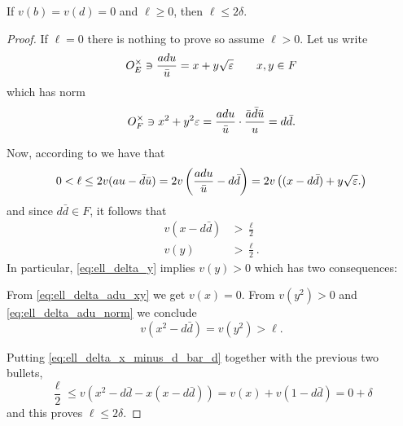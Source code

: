 \begin{lemma}
  [$\ell \le 2 \delta$]
  If $v(b) = v(d) = 0$ and $\ell \ge 0$, then $\ell \le 2 \delta$.
  \label{lem:ell_le_2_delta}
\end{lemma}
\begin{proof}
  If $\ell = 0$ there is nothing to prove so assume $\ell > 0$.
  Let us write
  \begin{equation}
    O_E^\times \ni \frac{a d u}{\bar u} = x + y \sqrt{\varepsilon} \qquad x,y \in F
    \label{eq:ell_delta_adu_xy}
  \end{equation}
  which has norm
  \begin{equation}
    O_F^\times \ni x^2+y^2\varepsilon
    = \frac{a d u}{\bar u} \cdot \frac{\bar a \bar d \bar u}{u} = d \bar d.
    \label{eq:ell_delta_adu_norm}
  \end{equation}

  Now, according to  we have that
  \[ 0 < \ell \le 2v(au - \bar d \bar u)
    = 2v\left( \frac{a d u}{\bar u} - d \bar d \right)
    = 2v\left(  (x - d \bar d) + y \sqrt{\varepsilon}. \right) \]
  and since $d \bar d \in F$, it follows that
  \begin{align}
    v\left( x - d \bar d \right) &> \frac{\ell}{2} \label{eq:ell_delta_x_minus_d_bar_d} \\
    v(y) &> \frac{\ell}{2}. \label{eq:ell_delta_y}
  \end{align}
  In particular, \eqref{eq:ell_delta_y} implies $v(y) > 0$ which has two consequences:
  \begin{itemize}
    \ii From \eqref{eq:ell_delta_adu_xy} we get $v(x) = 0$.
    \ii From $v(y^2) > 0$ and \eqref{eq:ell_delta_adu_norm}
    we conclude \[ v(x^2 - d \bar d) = v(y^2) > \ell. \]
  \end{itemize}
  Putting \eqref{eq:ell_delta_x_minus_d_bar_d} together with the previous two bullets,
  \[ \frac{\ell}{2} \le v\left( x^2 - d \bar d - x(x - d \bar d) \right)
    = v(x) + v(1-d \bar d) = 0 + \delta \]
  and this proves $\ell \le 2\delta$.
\end{proof}

